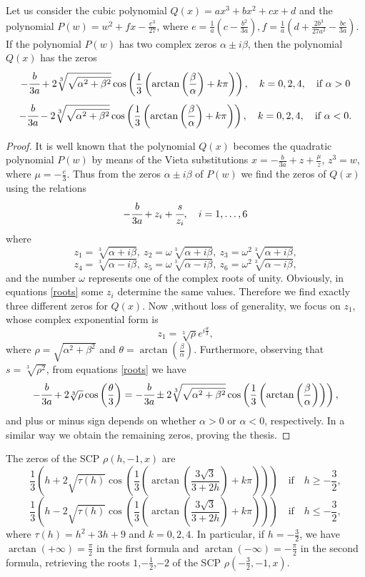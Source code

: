 \documentclass[12pt,reqno]{article}
\begin{document}
\begin{lemma} \label{newsolve}
Let us consider the cubic polynomial $Q(x)=ax^3+bx^2+cx+d$ and the polynomial $P(w)=w^2+fx-\frac{e^3}{27}$, where $e=\frac{1}{a}\left(c-\frac{b^2}{3a}\right), f=\frac{1}{a}\left(d+\frac{2b^3}{27a^2}-\frac{bc}{3a}\right)$. If the polynomial $P(w)$ has two complex zeros $\alpha\pm i\beta$, then the polynomial $Q(x)$ has the zeros
$$-\cfrac{b}{3a}+2 \sqrt[3]{\sqrt{\alpha^2+\beta^2}}\cos \left(\frac{1}{3}\left(\arctan \left(\frac{\beta}{\alpha}\right)+k\pi\right)\right),\quad k=0,2,4,\quad \text{if} \ \alpha>0$$
$$-\cfrac{b}{3a}-2 \sqrt[3]{\sqrt{\alpha^2+\beta^2}}\cos \left(\frac{1}{3}\left(\arctan \left(\frac{\beta}{\alpha}\right)+k\pi\right)\right),\quad k=0,2,4,\quad \text{if} \ \alpha<0.$$
\end{lemma}
\begin{proof}
It is well known that the polynomial $Q(x)$ becomes the quadratic polynomial $P(w)$ by means of the Vieta substitutions $x=-\frac{b}{3a}+z+\frac{\mu}{z}$, $z^3=w$, where $\mu=-\frac{e}{3}$. Thus from the zeros $\alpha\pm i\beta$ of $P(w)$ we find the zeros of $Q(x)$ using the relations
\begin{equation} \label{roots} -\cfrac{b}{3a}+z_i+\cfrac{s}{z_i},\quad i=1,\ldots,6 \end{equation}
where 
$$z_1=\sqrt[3]{\alpha+i\beta}, \ z_2=\omega\sqrt[3]{\alpha+i\beta}, \ z_3=\omega^2\sqrt[3]{\alpha+i\beta},$$ $$z_4=\sqrt[3]{\alpha-i\beta}, \ z_5=\omega\sqrt[3]{\alpha-i\beta}, \ z_6=\omega^2\sqrt[3]{\alpha-i\beta},$$
and the number $\omega$ represents one of the complex roots of unity. Obviously, in equations \eqref{roots} some $z_i$ determine the same values. Therefore we find exactly three different zeros for $Q(x)$. Now ,without loss of generality, we focus on $z_1$, whose complex exponential form is  
$$z_1=\sqrt[3]{\rho} e^{i\frac{\theta}{3}},$$
where $\rho=\sqrt{\alpha^2+\beta^2}$ and $\theta=\arctan\left(\frac{\beta}{\alpha}\right)$.
Furthermore, observing that  $s=\sqrt[3]{\rho^2}$, from  equations \eqref{roots} we have
$$-\cfrac{b}{3a}+2\sqrt[3]{\rho}\cos \left(\frac{\theta}{3}\right)=-\cfrac{b}{3a}\pm 2 \sqrt[3]{\sqrt{\alpha^2+\beta^2}}\cos\left( \frac{1}{3}\left(\arctan \left(\frac{\beta}{\alpha}\right)\right)\right),$$
and plus or minus sign depends on whether $\alpha>0$ or $\alpha<0$, respectively. In a similar way we obtain the remaining zeros, proving the thesis.
\end{proof}
\begin{theorem} \label{root-scp}
The zeros of the SCP $\rho(h,-1,x)$ are 
$$\frac{1}{3} \left(h+2 \sqrt{\tau(h)} \cos\left(\frac{1}{3} \left(\arctan\left(\frac{3 \sqrt{3}}{3+2 h}\right)+k\pi \right)\right)\right) \quad \text{if}\quad h\geq-\frac{3}{2},$$
$$\frac{1}{3} \left(h-2 \sqrt{\tau(h)} \cos\left(\frac{1}{3} \left(\arctan\left(\frac{3 \sqrt{3}}{3+2 h} \right)+k\pi\right)\right)\right)\quad \text{if}\quad h\leq-\frac{3}{2},$$
where $\tau(h)=h^2+3h+9$ and $k=0,2,4$. In particular, if $h=-\frac{3}{2}$, we have $\arctan(+\infty)=\frac{\pi}{2}$ in the first formula and $\arctan(-\infty)=-\frac{\pi}{2}$ in the second formula, retrieving the roots $1$,$-\frac{1}{2}$,$-2$ of the SCP $\rho(-\frac{3}{2},-1,x)$.
\end{theorem}
\end{document}
